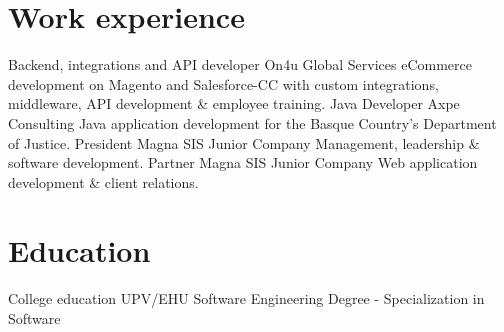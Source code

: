 \documentclass[letterpaper]{twentysecondcv} %
\begin{document}

\section{Work experience}

\begin{twenty} %
	    {Backend, integrations and API developer}
    	{On4u Global Services}
    	{eCommerce development on Magento and Salesforce-CC with custom integrations, middleware, API development \& employee training.}
	    {Java Developer}
    	{Axpe Consulting}
    	{Java application development for the Basque Country's Department of Justice.}
	    {President}
    	{Magna SIS Junior Company}
    	{Management, leadership \& software development.}
	    {Partner}
    	{Magna SIS Junior Company}
    	{Web application  development \& client relations.}
\end{twenty}


\section{Education}

\begin{twenty} %
	{College education}
	{UPV/EHU}
	{Software Engineering Degree - Specialization in Software}
\end{twenty}
\end{document}
